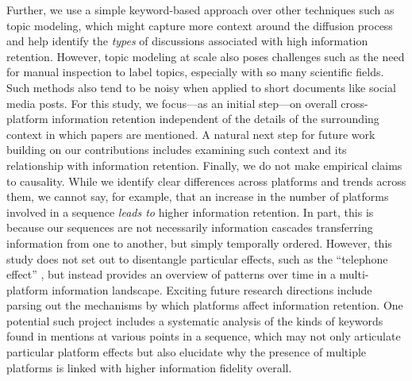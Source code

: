 \documentclass[letterpaper]{article} %
\begin{document}
Further, we use a simple keyword-based approach over other techniques such as topic modeling, which might capture more context around the diffusion process and help identify the \textit{types} of discussions associated with high information retention. However, topic modeling at scale also poses challenges such as the need for manual inspection to label topics, especially with so many scientific fields. Such methods also tend to be noisy when applied to short documents like social media posts. For this study, we focus---as an initial step---on overall cross-platform information retention independent of the details of the surrounding context in which papers are mentioned. A natural next step for future work building on our contributions includes examining such context and its relationship with information retention.  Finally, we do not make empirical claims to causality. While we identify clear differences across platforms and trends across them, we cannot say, for example, that an increase in the number of platforms involved in a sequence \emph{leads to} higher information retention. In part, this is because our sequences are not necessarily information cascades transferring information from one to another, but simply temporally ordered. However, this study does not set out to disentangle particular effects, such as the ``telephone effect'' \citep{ribeiroMessageDistortionInformation2019}, but instead provides an overview of patterns over time in a multi-platform information landscape. Exciting future research directions include parsing out the mechanisms by which platforms affect information retention. One potential such project includes a systematic analysis of the kinds of keywords found in mentions at various points in a sequence, which may not only articulate particular platform effects but also elucidate why the presence of multiple platforms is linked with higher information fidelity overall.
\end{document}

